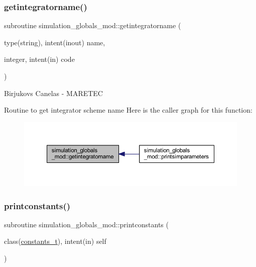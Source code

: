 \subsubsection{\texorpdfstring{getintegratorname()}{getintegratorname()}}
{\footnotesize\ttfamily subroutine simulation\+\_\+globals\+\_\+mod\+::getintegratorname (\begin{DoxyParamCaption}\item[{type(string), intent(inout)}]{name,  }\item[{integer, intent(in)}]{code }\end{DoxyParamCaption})\hspace{0.3cm}{\ttfamily [private]}}



Birjukovs Canelas -\/ M\+A\+R\+E\+T\+EC 

Routine to get integrator scheme name Here is the caller graph for this function\+:
\nopagebreak
\begin{figure}[H]
\begin{center}
\leavevmode
\includegraphics[width=350pt]{namespacesimulation__globals__mod_a68e871ed8e5d3930884e968c6fdafddc_icgraph}
\end{center}
\end{figure}
\mbox{\label{namespacesimulation__globals__mod_a20ba28d72a9bea823d9373a94f97026e}} 
\subsubsection{\texorpdfstring{printconstants()}{printconstants()}}
{\footnotesize\ttfamily subroutine simulation\+\_\+globals\+\_\+mod\+::printconstants (\begin{DoxyParamCaption}\item[{class(\hyperlink{structsimulation__globals__mod_1_1constants__t}{constants\+\_\+t}), intent(in)}]{self }\end{DoxyParamCaption})\hspace{0.3cm}{\ttfamily [private]}}



